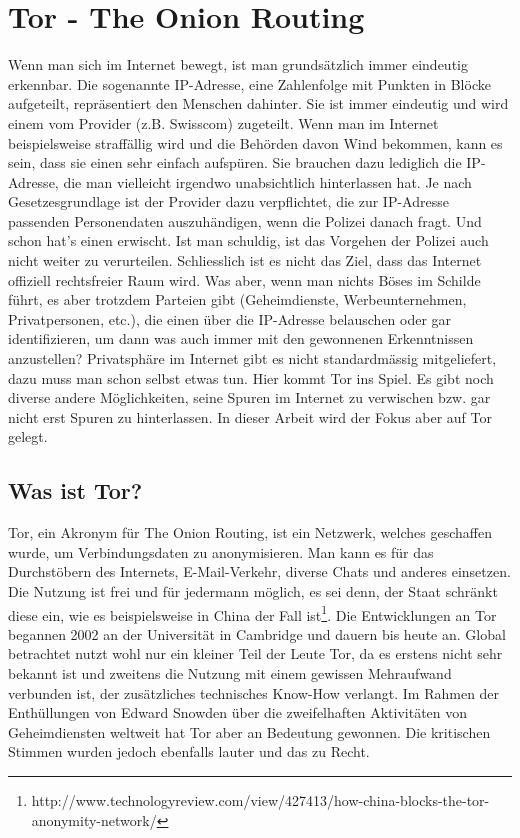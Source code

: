 \newpage
\section{Tor - The Onion Routing}
Wenn man sich im Internet bewegt, ist man grundsätzlich immer eindeutig erkennbar. Die sogenannte IP-Adresse, eine Zahlenfolge mit Punkten in Blöcke aufgeteilt, repräsentiert den Menschen dahinter. Sie ist immer eindeutig und wird einem vom Provider (z.B. Swisscom) zugeteilt. Wenn man im Internet beispielsweise straffällig wird und die Behörden davon Wind bekommen, kann es sein, dass sie einen sehr einfach aufspüren. Sie brauchen dazu lediglich die IP-Adresse, die man vielleicht irgendwo unabsichtlich hinterlassen hat. Je nach Gesetzesgrundlage ist der Provider dazu verpflichtet, die zur IP-Adresse passenden Personendaten auszuhändigen, wenn die Polizei danach fragt. Und schon hat's einen erwischt. Ist man schuldig, ist das Vorgehen der Polizei auch nicht weiter zu verurteilen. Schliesslich ist es nicht das Ziel, dass das Internet offiziell rechtsfreier Raum wird. Was aber, wenn man nichts Böses im Schilde führt, es aber trotzdem Parteien gibt (Geheimdienste, Werbeunternehmen, Privatpersonen, etc.), die einen über die IP-Adresse belauschen oder gar identifizieren, um dann was auch immer mit den gewonnenen Erkenntnissen anzustellen? Privatsphäre im Internet gibt es nicht standardmässig mitgeliefert, dazu muss man schon selbst etwas tun. Hier kommt Tor ins Spiel. Es gibt noch diverse andere Möglichkeiten, seine Spuren im Internet zu verwischen bzw. gar nicht erst Spuren zu hinterlassen. In dieser Arbeit wird der Fokus aber auf Tor gelegt.

\subsection{Was ist Tor?}
Tor, ein Akronym für The Onion Routing, ist ein Netzwerk, welches geschaffen wurde, um Verbindungsdaten zu anonymisieren. Man kann es für das Durchstöbern des Internets, E-Mail-Verkehr, diverse Chats und anderes einsetzen. Die Nutzung ist frei und für jedermann möglich, es sei denn, der Staat schränkt diese ein, wie es beispielsweise in China der Fall ist\footnote{http://www.technologyreview.com/view/427413/how-china-blocks-the-tor-anonymity-network/}.
Die Entwicklungen an Tor begannen 2002 an der Universität in Cambridge und dauern bis heute an. Global betrachtet nutzt wohl nur ein kleiner Teil der Leute Tor, da es erstens nicht sehr bekannt ist und zweitens die Nutzung mit einem gewissen Mehraufwand verbunden ist, der zusätzliches technisches Know-How verlangt. Im Rahmen der Enthüllungen von Edward Snowden über die zweifelhaften Aktivitäten von Geheimdiensten weltweit hat Tor aber an Bedeutung gewonnen. Die kritischen Stimmen wurden jedoch ebenfalls lauter und das zu Recht.

